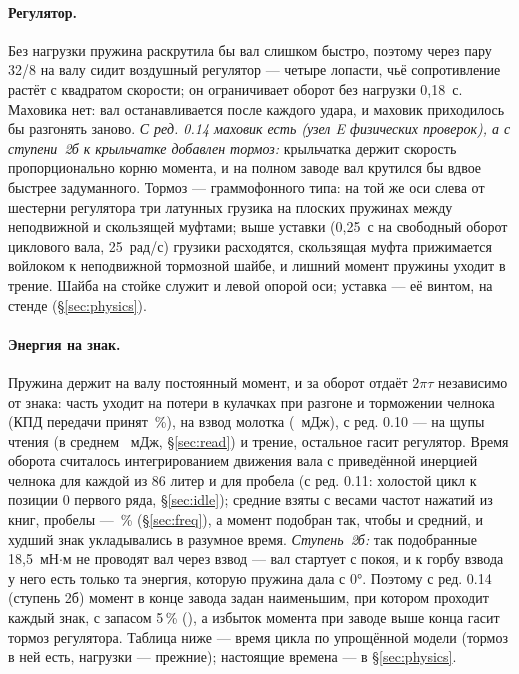 \paragraph{Регулятор.} Без нагрузки пружина раскрутила бы вал слишком быстро, поэтому через пару 32/8 на валу сидит воздушный регулятор — четыре лопасти, чьё сопротивление растёт с квадратом скорости; он ограничивает оборот без нагрузки 0,18~с. Маховика нет: вал останавливается после каждого удара, и маховик приходилось бы разгонять заново. \emph{С ред. 0.14 маховик есть (узел E физических проверок), а с ступени~2б к крыльчатке добавлен тормоз:} крыльчатка держит скорость пропорционально корню момента, и на полном заводе вал крутился бы вдвое быстрее задуманного. Тормоз — граммофонного типа: на той же оси слева от шестерни регулятора три латунных грузика на плоских пружинах между неподвижной и скользящей муфтами; выше уставки (0,25~с на свободный оборот циклового вала, 25~рад/с) грузики расходятся, скользящая муфта прижимается войлоком к неподвижной тормозной шайбе, и лишний момент пружины уходит в трение. Шайба на стойке служит и левой опорой оси; уставка — её винтом, на стенде (\S\ref{sec:physics}).

\paragraph{Энергия на знак.} Пружина держит на валу постоянный момент, и за оборот отдаёт $2\pi\tau$ независимо от знака: часть уходит на потери в кулачках при разгоне и торможении челнока (КПД передачи принят \meta\,\%), на взвод молотка (\mEhammer~мДж), с ред. 0.10 — на щупы чтения (в среднем \rdEavg~мДж, \S\ref{sec:read}) и трение, остальное гасит регулятор. Время оборота считалось интегрированием движения вала с приведённой инерцией челнока для каждой из 86 литер и для пробела (с ред. 0.11: холостой цикл к позиции 0 первого ряда, \S\ref{sec:idle}); средние взяты с весами частот нажатий из книг, пробелы — \fqSP\,\% (\S\ref{sec:freq}), а момент подобран так, чтобы и средний, и худший знак укладывались в разумное время. \emph{Ступень~2б:} так подобранные 18,5~мН$\cdot$м не проводят вал через взвод — вал стартует с покоя, и к горбу взвода у него есть только та энергия, которую пружина дала с 0°. Поэтому с ред. 0.14 (ступень 2б) момент в конце завода задан наименьшим, при котором проходит каждый знак, с запасом 5\,\% (), а избыток момента при заводе выше конца гасит тормоз регулятора. Таблица ниже — время цикла по упрощённой модели  (тормоз в ней есть, нагрузки — прежние); настоящие времена — в \S\ref{sec:physics}.

